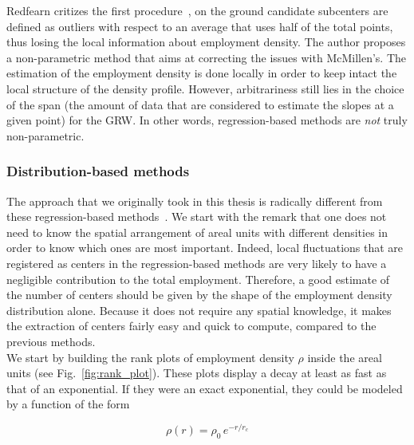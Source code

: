 Redfearn critizes the first procedure~\cite{Redfearn:2007}, on the ground candidate
subcenters are defined as outliers with respect to an average that uses half of the total
points, thus losing the local information about employment
density. The author proposes a non-parametric method that aims at correcting the issues
with McMillen's\cite{Redfearn:2007}. The estimation of the employment density is
done locally in order to keep intact the local structure of the density profile.
However, arbitrariness still lies in the choice of the span (the amount of data
that are considered to estimate the slopes at a given point) for the GRW. In
other words, regression-based methods are \emph{not} truly non-parametric.\\

\subsubsection{Distribution-based methods}
\label{ssub:distribution_based_methods}


The approach that we originally took in this thesis is radically different from
these regression-based methods~\cite{Louf:2013_polycentric}. We start with the
remark that one does not need to know the spatial arrangement of areal units
with different densities in order to know which ones are most important. Indeed,
local fluctuations that are registered as centers in the regression-based
methods are very likely to have a negligible contribution to the total
employment. Therefore, a good estimate of the number of centers should be given
by the shape of the employment density distribution alone. Because it does not
require any spatial knowledge, it makes the extraction of centers fairly easy
and quick to compute, compared to the previous methods.\\


We start by building the rank plots of employment density $\rho$ inside the
areal units (see Fig.~\ref{fig:rank_plot}). These plots display a decay at least as fast as that of an
exponential. If they were an exact exponential, they could be modeled by a
function of the form

\begin{equation}
    \rho(r) = \rho_0\,e^{-r/r_c}
    \label{eq:}
\end{equation}

